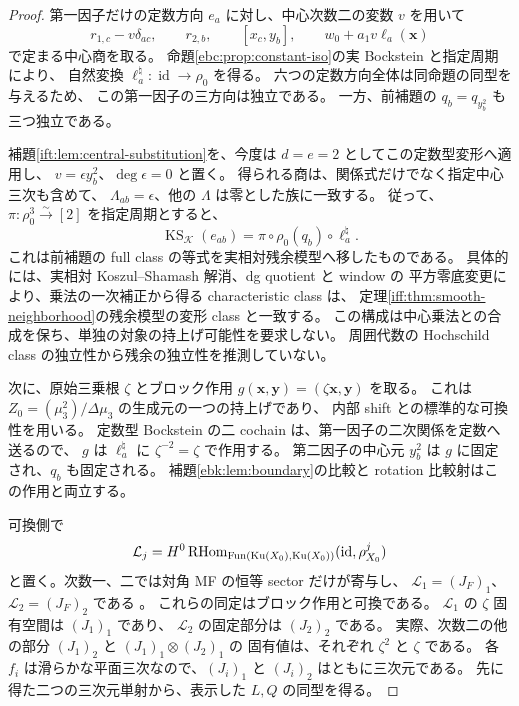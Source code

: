 \begin{proof}
第一因子だけの定数方向 $e_a$ に対し、中心次数二の変数 $v$ を用いて
\[
 r_{1,c}-v\delta_{ac},\qquad r_{2,b},\qquad[x_c,y_b],\qquad
 w_0+a_1v\ell_a(\mathbf x)
\]
で定まる中心商を取る。
命題\ref{ebc:prop:constant-iso}の実 Bockstein と指定周期により、
自然変換 $\ell_a^\natural:\operatorname{id}\to\rho_0$ を得る。
六つの定数方向全体は同命題の同型を与えるため、
この第一因子の三方向は独立である。
一方、前補題の $q_b=q_{y_b^2}$ も三つ独立である。

補題\ref{ift:lem:central-substitution}を、今度は $d=e=2$ としてこの定数型変形へ適用し、
$v=\epsilon y_b^2$、$\deg\epsilon=0$ と置く。
得られる商は、関係式だけでなく指定中心三次も含めて、
$\Lambda_{ab}=\epsilon$、他の $\Lambda$ は零とした族に一致する。
従って、$\pi:\rho_0^3\xrightarrow{\sim}[2]$ を指定周期とすると、
\begin{equation}\label{ift:eq:categorical-product}
 \operatorname{KS}_{\mathcal K}(e_{ab})
       =\pi\circ\rho_0(q_b)\circ\ell_a^\natural.
\end{equation}
これは前補題の full class の等式を実相対残余模型へ移したものである。
具体的には、実相対 Koszul--Shamash 解消、dg quotient と window の
平方零底変更により、乗法の一次補正から得る characteristic class は、
定理\ref{iff:thm:smooth-neighborhood}の残余模型の変形 class と一致する。
この構成は中心乗法との合成を保ち、単独の対象の持上げ可能性を要求しない。
周囲代数の Hochschild class の独立性から残余の独立性を推測していない。

次に、原始三乗根 $\zeta$ とブロック作用
$g(\mathbf x,\mathbf y)=(\zeta\mathbf x,\mathbf y)$ を取る。
これは $Z_0=(\mu_3^2)/\Delta\mu_3$ の生成元の一つの持上げであり、
内部 shift との標準的な可換性を用いる。
定数型 Bockstein の二 cochain は、第一因子の二次関係を定数へ送るので、
$g$ は $\ell_a^\natural$ に $\zeta^{-2}=\zeta$ で作用する。
第二因子の中心元 $y_b^2$ は $g$ に固定され、$q_b$ も固定される。
補題\ref{ebk:lem:boundary}の比較と rotation 比較射はこの作用と両立する。

可換側で
\[
 \mathcal L_j=
 H^0\operatorname{RHom}_{\operatorname{Fun}(\operatorname{Ku}(X_0),\operatorname{Ku}(X_0))}
             (\operatorname{id},\rho_{X_0}^j)
\]
と置く。次数一、二では対角 MF の恒等 sector だけが寄与し、
$\mathcal L_1=(J_F)_1$、$\mathcal L_2=(J_F)_2$ である
\cite[Theorem~5.39 and proof]{NFBFKKernels}。
これらの同定はブロック作用と可換である。
$\mathcal L_1$ の $\zeta$ 固有空間は $(J_1)_1$ であり、
$\mathcal L_2$ の固定部分は $(J_2)_2$ である。
実際、次数二の他の部分 $(J_1)_2$ と $(J_1)_1\otimes(J_2)_1$ の
固有値は、それぞれ $\zeta^2$ と $\zeta$ である。
各 $f_i$ は滑らかな平面三次なので、$(J_i)_1$ と $(J_i)_2$ はともに三次元である。
先に得た二つの三次元単射から、表示した $L,Q$ の同型を得る。


\end{proof}
